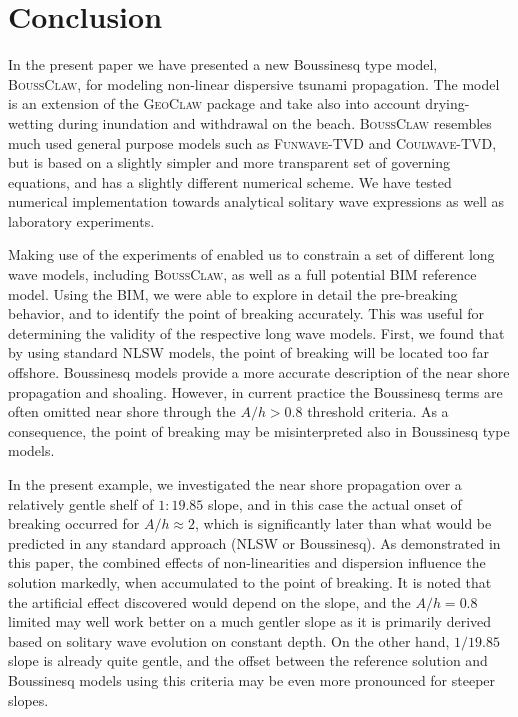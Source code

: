 \documentclass[review]{elsarticle}
\newcommand{\BoussClaw}{\textsc{BoussClaw} }
\newcommand{\BoussClawt}{\textsc{BoussClaw}}
\begin{document}
\section{Conclusion}
\label{sec:conclusion}

In the present paper we have presented a new  
Boussinesq type model, \BoussClawt,
for modeling non-linear dispersive tsunami propagation. The model is an extension of the \textsc{GeoClaw} package and  take also into account drying-wetting during inundation and withdrawal on the beach.
\BoussClaw resembles much used general purpose models such as \textsc{Funwave-TVD} and
\textsc{Coulwave-TVD}, but is based on a slightly simpler and more transparent set of governing equations,
and has a slightly different numerical scheme. We have tested numerical implementation towards
analytical solitary wave expressions as well as laboratory experiments.

Making use of the experiments of \citet{synolakis1987runup} 
enabled us to
constrain a set of different long wave models, including \BoussClawt, as well as a full potential
BIM reference model. Using the BIM, we were able to explore in detail the pre-breaking behavior,
and to identify the point of breaking accurately. This was useful for determining the 
validity of the respective long wave models. First, we found that by using standard NLSW models,
the point of breaking will be located too far offshore. Boussinesq models
provide  a more accurate description of the near shore propagation and shoaling. 
However, in current practice the Boussinesq terms are often omitted near shore through the $A/h>0.8$ threshold criteria.
As a consequence, the point of breaking may be misinterpreted also in Boussinesq type models.

In the present example, we investigated the near shore propagation over a relatively gentle shelf of $1:19.85$ slope,
and in this case the actual onset of breaking occurred for $A/h \approx 2$, which is significantly later
than what would be predicted in any standard approach (NLSW or Boussinesq). As demonstrated in this paper,
the combined effects of non-linearities and dispersion influence the solution markedly, when accumulated to the point
of breaking. It is noted that the artificial effect discovered would depend on the slope, 
and the $A/h=0.8$ limited may well work better on a much gentler slope as it is primarily derived based on 
solitary wave evolution on constant depth. On the other hand, $1/19.85$ slope is already quite gentle,
and the offset between the reference solution and Boussinesq models using this criteria may
be even more pronounced for steeper slopes.
\end{document}
